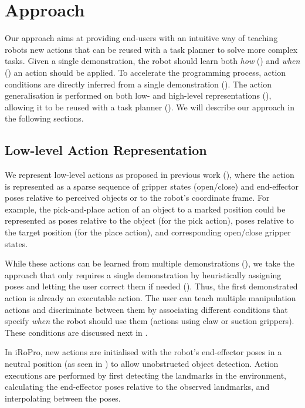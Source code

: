 \section{Approach}
\label{sec:approach}
Our approach aims at providing end-users with an intuitive way of teaching robots new actions that can be reused with a task planner to solve more complex tasks.
Given a single demonstration, the robot should learn both \textit{how} () and \textit{when} () an action should be applied.
To accelerate the programming process, action conditions are directly inferred from a single demonstration ().
The action generalisation is performed on both low- and high-level representations (), allowing it to be reused with a task planner ().
We will describe our approach in the following sections.

\subsection{Low-level Action Representation}
\label{sec:lowlevel}
We represent low-level actions as proposed in previous work (\cite{akgun2012keyframe,alexandrova2014robot}), where the action is represented as a sparse sequence of gripper states (open/close) and end-effector poses relative to perceived objects or to the robot's coordinate frame.
For example, the pick-and-place action of an object to a marked position could be represented as poses relative to the object (for the pick action), poses relative to the target position (for the place action), and corresponding open/close gripper states. 

While these actions can be learned from multiple demonstrations (\cite{niekum2012learning}), we take the approach that only requires a single demonstration by heuristically assigning poses and letting the user correct them if needed (\cite{alexandrova2014robot}).
Thus, the first demonstrated action is already an executable action.
The user can teach multiple manipulation actions and discriminate between them by associating different conditions that specify \textit{when} the robot should use them (\eg actions using claw or suction grippers).
These conditions are discussed next in .

In iRoPro, new actions are initialised with the robot's end-effector poses in a neutral position (as seen in ) to allow unobstructed object detection.
Action executions are performed by first detecting the landmarks in the environment, calculating the end-effector poses relative to the observed landmarks, and interpolating between the poses.

